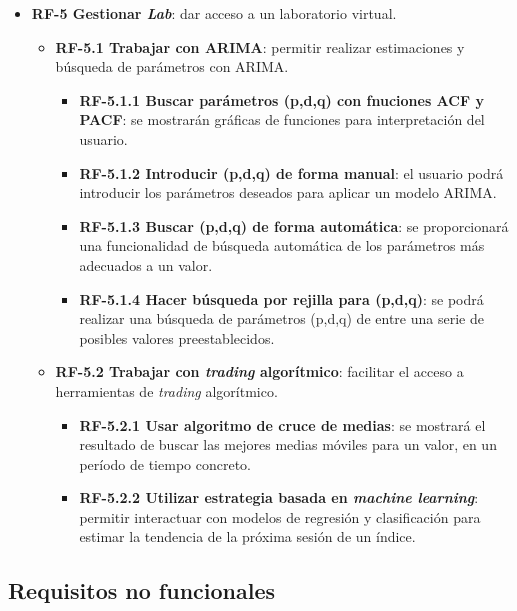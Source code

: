 \begin{itemize}
\item
\textbf{RF-5 Gestionar \emph{Lab}}: dar acceso a un laboratorio virtual. 
	\begin{itemize}
        \item \textbf{RF-5.1 Trabajar con ARIMA}: permitir realizar estimaciones y búsqueda 
        de parámetros con ARIMA. 
        \begin{itemize}
            \item \textbf{RF-5.1.1 Buscar parámetros (p,d,q) con fnuciones ACF y PACF}: se 
            mostrarán gráficas de funciones para interpretación del usuario. 
            \item \textbf{RF-5.1.2 Introducir (p,d,q) de forma manual}: el usuario podrá 
            introducir los parámetros deseados para aplicar un modelo ARIMA. 
            \item \textbf{RF-5.1.3 Buscar (p,d,q) de forma automática}: se proporcionará 
            una funcionalidad de búsqueda automática de los parámetros más adecuados a un 
            valor.
            \item \textbf{RF-5.1.4 Hacer búsqueda por rejilla para (p,d,q)}: se podrá 
            realizar una búsqueda de parámetros (p,d,q) de entre una serie de posibles 
            valores preestablecidos.             
        \end{itemize}
        \item \textbf{RF-5.2 Trabajar con \emph{trading} algorítmico}: facilitar el acceso 
        a herramientas de \emph{trading} algorítmico.
        \begin{itemize}
            \item \textbf{RF-5.2.1 Usar algoritmo de cruce de medias}: se mostrará el 
            resultado de buscar las mejores medias móviles para un valor, en un período de 
            tiempo concreto. 
            \item \textbf{RF-5.2.2 Utilizar estrategia basada en \emph{machine learning}}: 
            permitir interactuar con modelos de regresión y clasificación para estimar la 
            tendencia de la próxima sesión de un índice.
        \end{itemize}
	\end{itemize}

\end{itemize}


\subsection{Requisitos no funcionales}

